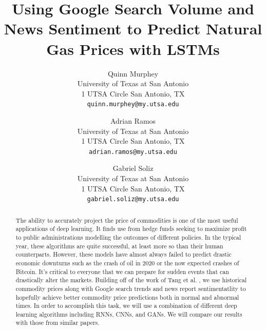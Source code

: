 \documentclass[final]{cvpr}
\begin{document}
\title{Using Google Search Volume and News Sentiment to Predict Natural Gas
Prices with LSTMs}

\author{Quinn Murphey\\
University of Texas at San Antonio\\
1 UTSA Circle San Antonio, TX\\
{\tt\small quinn.murphey@my.utsa.edu}
\and
Adrian Ramos\\
University of Texas at San Antonio\\
1 UTSA Circle San Antonio, TX\\
{\tt\small adrian.ramos@my.utsa.edu}

\and
Gabriel Soliz\\
University of Texas at San Antonio\\
1 UTSA Circle San Antonio, TX\\
{\tt\small gabriel.soliz@my.utsa.edu}
}

\maketitle


\begin{abstract}
    The ability to accurately project the price of commodities is one of the
    most useful applications of deep learning. It finds use from hedge funds
    seeking to maximize profit to public administrations modelling the outcomes
    of different policies. In the typical year, these algorithms are quite 
    successful, at least more so than their human counterparts. However, these
    models have almost always failed to predict drastic economic downturns such
    as the crash of oil in 2020 or the now expected crashes of Bitcoin.
    It’s critical to everyone that we can prepare for sudden events that can
    drastically alter the markets. Building off of the work of Tang et al.
    \cite{tang}, we use historical commodity prices along with Google
    search trends and news report sentimentatlity to hopefully achieve better
    commodity price predictions both in normal and abnormal times. In order
    to accomplish this task, we will use a combination of different deep
    learning algorithms including RNNs, CNNs, and GANs. We will compare our
    results with those from similar papers.
\end{abstract}
\end{document}
